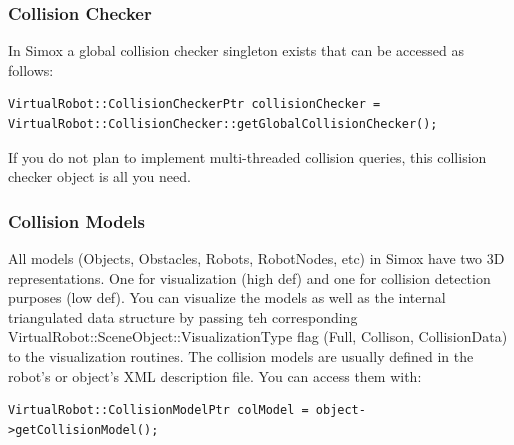 \subsubsection*{Collision Checker}
\par
In Simox a global collision checker singleton exists that can be accessed as follows: 
\begin{lstlisting}
VirtualRobot::CollisionCheckerPtr collisionChecker = VirtualRobot::CollisionChecker::getGlobalCollisionChecker();
\end{lstlisting}
If you do not plan to implement multi-threaded collision queries, this collision checker object is all you need. 
\par
\subsubsection*{Collision Models}
All models (Objects, Obstacles, Robots, RobotNodes, etc) in Simox have two 3D representations. One for visualization (high def) and one for collision detection purposes (low def). You can visualize the models as well as the internal triangulated data structure by passing teh corresponding VirtualRobot::SceneObject::VisualizationType flag (Full, Collison, CollisionData) to the visualization routines. The collision models are usually defined in the robot's or object's XML description file. You can access them with: 
\begin{lstlisting}
VirtualRobot::CollisionModelPtr colModel = object->getCollisionModel();
\end{lstlisting}
